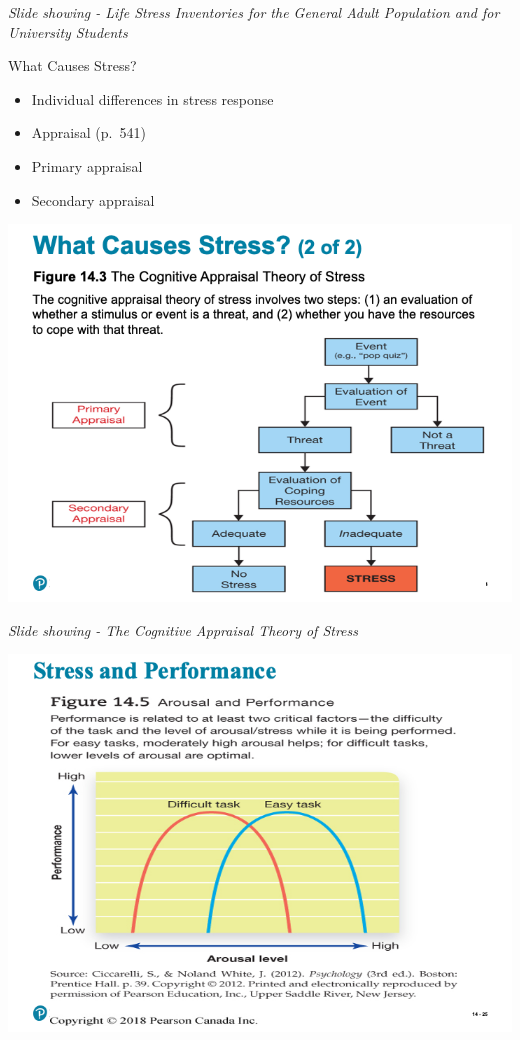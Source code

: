 \documentclass[
]{book}
\providecommand{\tightlist}{%
  \setlength{\itemsep}{0pt}\setlength{\parskip}{0pt}}
\begin{document}
\begin{reflect}
\emph{Slide showing - Life Stress Inventories for the General Adult Population and for University Students}

What Causes Stress?

\begin{itemize}
\tightlist
\item
  Individual differences in stress response\\
\item
  Appraisal (p.~541)\\
\item
  Primary appraisal\\
\item
  Secondary appraisal
\end{itemize}

\includegraphics{assets/unit_8/slide_24.png}

\emph{Slide showing - The Cognitive Appraisal Theory of Stress}

\includegraphics{assets/unit_8/slide_25.png}


\end{reflect}
\end{document}
